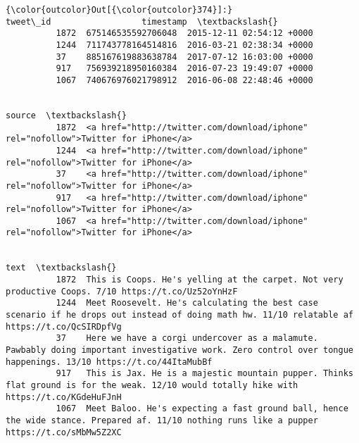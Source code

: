 \documentclass[11pt]{article}
\begin{document}
\begin{Verbatim}[commandchars=\\\{\}]
{\color{outcolor}Out[{\color{outcolor}374}]:}                 tweet\_id                  timestamp  \textbackslash{}
          1872  675146535592706048  2015-12-11 02:54:12 +0000   
          1244  711743778164514816  2016-03-21 02:38:34 +0000   
          37    885167619883638784  2017-07-12 16:03:00 +0000   
          917   756939218950160384  2016-07-23 19:49:07 +0000   
          1067  740676976021798912  2016-06-08 22:48:46 +0000   
          
                                                                                            source  \textbackslash{}
          1872  <a href="http://twitter.com/download/iphone" rel="nofollow">Twitter for iPhone</a>   
          1244  <a href="http://twitter.com/download/iphone" rel="nofollow">Twitter for iPhone</a>   
          37    <a href="http://twitter.com/download/iphone" rel="nofollow">Twitter for iPhone</a>   
          917   <a href="http://twitter.com/download/iphone" rel="nofollow">Twitter for iPhone</a>   
          1067  <a href="http://twitter.com/download/iphone" rel="nofollow">Twitter for iPhone</a>   
          
                                                                                                                                                                          text  \textbackslash{}
          1872  This is Coops. He's yelling at the carpet. Not very productive Coops. 7/10 https://t.co/Uz52oYnHzF                                                               
          1244  Meet Roosevelt. He's calculating the best case scenario if he drops out instead of doing math hw. 11/10 relatable af https://t.co/QcSIRDpfVg                     
          37    Here we have a corgi undercover as a malamute. Pawbably doing important investigative work. Zero control over tongue happenings. 13/10 https://t.co/44ItaMubBf   
          917   This is Jax. He is a majestic mountain pupper. Thinks flat ground is for the weak. 12/10 would totally hike with https://t.co/KGdeHuFJnH                         
          1067  Meet Baloo. He's expecting a fast ground ball, hence the wide stance. Prepared af. 11/10 nothing runs like a pupper https://t.co/sMbMw5Z2XC                      
          

\end{Verbatim}
\end{document}
